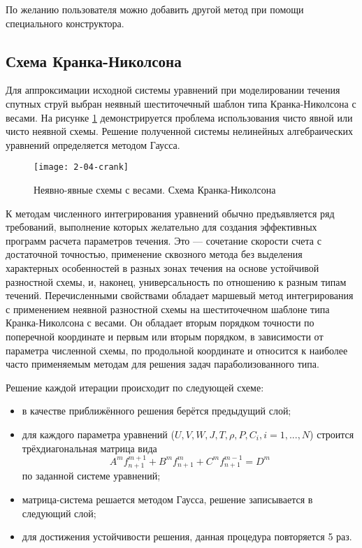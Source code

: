 По желанию пользователя можно добавить другой метод при помощи специального конструктора.

\subsection{Схема Кранка-Николсона}

Для аппроксимации исходной системы уравнений \cite{book2} при моделировании течения спутных струй выбран неявный шеститочечный шаблон типа Кранка-Николсона с весами. На рисунке \ref{fig:crank} демонстрируется проблема использования чисто явной или чисто неявной схемы. Решение полученной системы нелинейных алгебраических уравнений определяется методом Гаусса.

\begin{figure}
    \texttt{[image: 2-04-crank]}
    \caption{Неявно-явные схемы с весами. Схема Кранка-Николсона}
    \label{fig:crank}
\end{figure}

К методам численного интегрирования уравнений обычно предъявляется ряд требований, выполнение которых желательно для создания эффективных программ расчета параметров течения. Это — сочетание скорости счета с достаточной точностью, применение сквозного метода без выделения характерных особенностей в разных зонах течения на основе устойчивой разностной схемы, и, наконец, универсальность по отношению к разным типам течений. Перечисленными свойствами обладает маршевый метод интегрирования с применением неявной разностной схемы на шеститочечном шаблоне типа Кранка-Николсона с весами. Он обладает вторым порядком точности по поперечной координате и первым или вторым порядком, в зависимости от параметра численной схемы, по продольной координате и относится к наиболее часто применяемым методам для решения задач параболизованного типа.

Решение каждой итерации происходит по следующей схеме:

\begin{itemize}
    \item в качестве приближённого решения берётся предыдущий слой;
    \item для каждого параметра уравнений ($U, V, W, J, T, \rho, P, C_i, i = 1,...,N$) строится трёхдиагональная матрица вида
    \begin{equation}
        A^mf_{n + 1}^{m + 1} + B^mf_{n + 1}^{m} + C^mf_{n + 1}^{m - 1} = D^m
    \end{equation}
    по заданной системе уравнений;
    \item матрица-система решается методом Гаусса, решение записывается в следующий слой;
    \item для достижения устойчивости решения, данная процедура повторяется 5 раз.
\end{itemize}

